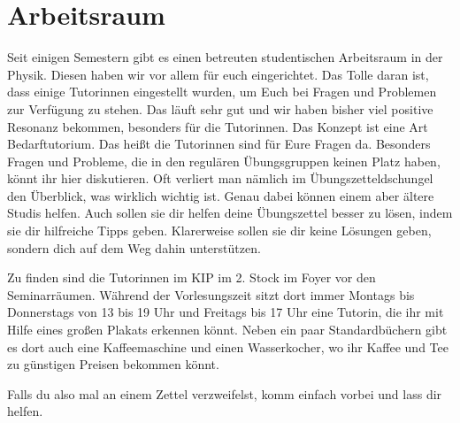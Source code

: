 \section{Arbeitsraum}
\label{sec:arbeitsraum}
Seit einigen Semestern gibt es einen betreuten studentischen Arbeitsraum in der Physik. Diesen haben wir vor allem für euch eingerichtet. Das Tolle daran ist, dass einige Tutorinnen eingestellt wurden, um Euch bei Fragen und Problemen zur Verfügung zu stehen. Das läuft sehr gut und wir haben bisher viel positive Resonanz bekommen, besonders für die Tutorinnen. Das Konzept ist eine Art Bedarftutorium. Das heißt die Tutorinnen sind für Eure Fragen da. Besonders Fragen und Probleme, die in den regulären Übungsgruppen keinen Platz haben, könnt ihr hier diskutieren. Oft verliert man nämlich im Übungszetteldschungel den Überblick, was wirklich wichtig ist. Genau dabei können einem aber ältere Studis helfen. Auch sollen sie dir helfen deine Übungszettel besser zu lösen, indem sie dir hilfreiche Tipps geben. Klarerweise sollen sie dir keine Lösungen geben, sondern dich auf dem Weg dahin unterstützen.

Zu finden sind die Tutorinnen im KIP im 2. Stock im Foyer vor den Seminarräumen. Während der Vorlesungszeit sitzt dort immer Montags bis Donnerstags von 13 bis 19 Uhr und Freitags bis 17 Uhr eine Tutorin, die ihr mit Hilfe eines großen Plakats erkennen könnt. Neben ein paar Standardbüchern gibt es dort auch eine Kaffeemaschine und einen Wasserkocher, wo ihr Kaffee und Tee zu günstigen Preisen bekommen könnt.

Falls du also mal an einem Zettel verzweifelst, komm einfach vorbei und lass dir helfen.
